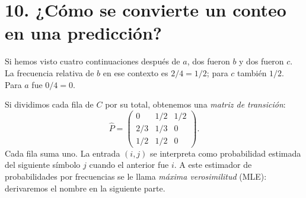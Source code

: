 \section*{10. ¿Cómo se convierte un conteo en una predicción?}
Si hemos visto cuatro continuaciones después de $a$, dos fueron $b$ y dos fueron $c$. La frecuencia relativa de $b$ en ese contexto es $2/4=1/2$; para $c$ también $1/2$. Para $a$ fue $0/4=0$.
\begin{center}
\end{center}
Si dividimos cada fila de $C$ por su total, obtenemos una \emph{matriz de transición}:
\[
\widehat P=\begin{pmatrix}0&1/2&1/2\\2/3&1/3&0\\1/2&1/2&0\end{pmatrix}.
\]
Cada fila suma uno. La entrada $(i,j)$ se interpreta como probabilidad estimada del siguiente símbolo $j$ cuando el anterior fue $i$. A este estimador de probabilidades por frecuencias se le llama \emph{máxima verosimilitud} (MLE): derivaremos el nombre en la siguiente parte.

